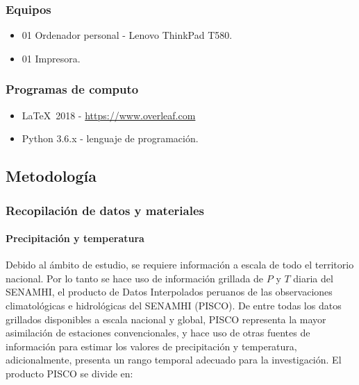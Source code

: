 \documentclass[12pt]{article}
\begin{document}
\subsubsection{Equipos}

\begin{itemize}
  \item 01 Ordenador personal - Lenovo ThinkPad T580.
  \item 01 Impresora.
\end{itemize}

\subsubsection{Programas de computo}

\begin{itemize}
  \item \LaTeX\  2018 - \url{https://www.overleaf.com}
  \item Python 3.6.x - lenguaje de programación.
\end{itemize}

\subsection{Metodología}

\subsubsection{Recopilación de datos y materiales}

\paragraph{Precipitación y temperatura}\mbox{}

Debido al ámbito de estudio, se requiere información a escala de todo el territorio nacional. Por lo tanto se hace uso de información grillada de $P$ y $T$ diaria del SENAMHI, el producto de Datos Interpolados peruanos de las observaciones climatológicas e hidrológicas del SENAMHI (PISCO). De entre todas los datos grillados disponibles a escala nacional y global, PISCO representa la mayor asimilación de estaciones convencionales, y hace uso de otras fuentes de información para estimar los valores de precipitación y temperatura, adicionalmente, presenta un rango temporal adecuado para la investigación. El producto PISCO se divide en:
\end{document}
